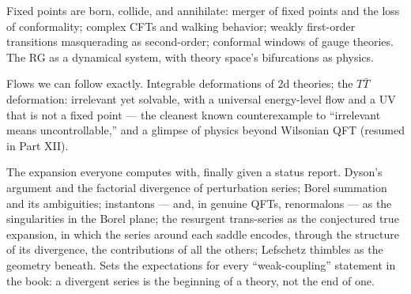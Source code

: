Fixed points are born, collide, and annihilate: merger of fixed points and the loss of conformality; complex CFTs and walking behavior; weakly first-order transitions masquerading as second-order; conformal windows of gauge theories. The RG as a dynamical system, with theory space's bifurcations as physics.

Flows we can follow exactly. Integrable deformations of 2d theories; the $T\bar{T}$ deformation: irrelevant yet solvable, with a universal energy-level flow and a UV that is not a fixed point --- the cleanest known counterexample to ``irrelevant means uncontrollable,'' and a glimpse of physics beyond Wilsonian QFT (resumed in Part XII).

The expansion everyone computes with, finally given a status report. Dyson's argument and the factorial divergence of perturbation series; Borel summation and its ambiguities; instantons --- and, in genuine QFTs, renormalons --- as the singularities in the Borel plane; the resurgent trans-series as the conjectured true expansion, in which the series around each saddle encodes, through the structure of its divergence, the contributions of all the others; Lefschetz thimbles as the geometry beneath. Sets the expectations for every ``weak-coupling'' statement in the book: a divergent series is the beginning of a theory, not the end of one.

